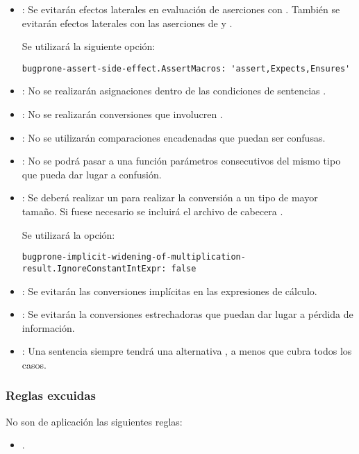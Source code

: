 \begin{itemize}

\item {}:
Se evitarán efectos laterales en evaluación de aserciones con .
También se evitarán efectos laterales con las aserciones de  
 y .

Se utilizará la siguiente opción:
\begin{lstlisting}
bugprone-assert-side-effect.AssertMacros: 'assert,Expects,Ensures'
\end{lstlisting}

\item {}:
No se realizarán asignaciones dentro de las condiciones de sentencias .

\item {}:
No se realizarán conversiones que involucren .

\item {}:
No se utilizarán comparaciones encadenadas que puedan ser confusas.

\item {}: 
No se podrá pasar a una función parámetros consecutivos del mismo tipo
que pueda dar lugar a confusión.

\item {}: 
Se deberá realizar un  para realizar la conversión a un
tipo de mayor tamaño. Si fuese necesario se incluirá el archivo de cabecera
.

Se utilizará la opción:
\begin{lstlisting}
bugprone-implicit-widening-of-multiplication-result.IgnoreConstantIntExpr: false
\end{lstlisting}

\item {}: 
Se evitarán las conversiones implícitas en las expresiones de cálculo.

\item {}:
Se evitarán la conversiones estrechadoras que puedan dar lugar a pérdida
de información.

\item {}:
Una sentencia  siempre tendrá una alternativa ,
a menos que cubra todos los casos.

\end{itemize}

\subsubsection{Reglas excuidas}

No son de aplicación las siguientes reglas:

\begin{itemize}

\item {}.

\end{itemize}
